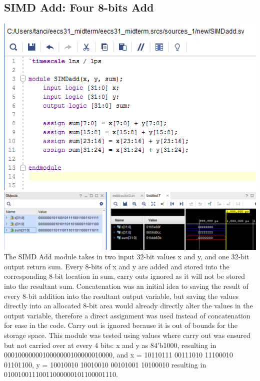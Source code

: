 \documentclass{article}
\begin{document}
\subsection{SIMD Add: Four 8-bits Add}
\includegraphics[scale=0.5]{photos/SIMDadd_code}
\break
\includegraphics[scale=0.5]{photos/simdadd_simulation}
\break
The SIMD Add module takes in two input 32-bit values x and y, and one 32-bit output return sum. Every 8-bits of x and y are added and stored into the corresponding 8-bit location in sum, carry outs ignored as it will not be stored into the resultant sum. Concatenation was an initial idea to saving the result of every 8-bit addition into the resultant output variable, but saving the values directly into an allocated 8-bit area would already directly alter the values in the output variable, therefore a direct assignment was used instead of concatenation for ease in the code. Carry out is ignored because it is out of bounds for the storage space. This module was tested using values where carry out was ensured but not carried over at every 4 bits:
x and y as {8{4'b1000}}, resulting in 0001000000010000000100000010000, and x = 10110111 00111010 11100010 01101100, y = 10010010 10010010 00101001 10100010 resulting in 01001001110011000000101100001110.
\end{document}
